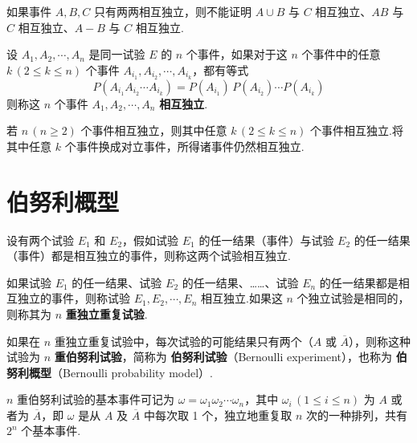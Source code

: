 \begin{note}
    \indent 如果事件 $A,B,C$ 只有两两相互独立，则不能证明 $A \cup B$ 与 $C$ 相互独立、$AB$ 与 $C$ 相互独立、$A-B$ 与 $C$ 相互独立.
\end{note}

\begin{definition}
    \indent 设 $A_1,A_2,\cdots,A_n$ 是同一试验 $E$ 的 $n$ 个事件，如果对于这 $n$ 个事件中的任意 $k\,(2\leqslant k\leqslant n)$ 个事件 $A_{i_1},A_{i_2},\cdots,A_{i_k}$，都有等式
    $$
    P(A_{i_1} A_{i_2} \cdots A_{i_k}) = P(A_{i_1}) \, P(A_{i_2}) \cdots P(A_{i_k})
    $$
    则称这 $n$ 个事件 $A_1,A_2,\cdots,A_n$ \textbf{相互独立}.
\end{definition}

\begin{conclusion}
    \indent 若 $n\, (n \geqslant 2)$ 个事件相互独立，则其中任意 $k\, (2 \leqslant k \leqslant n)$ 个事件相互独立.将其中任意 $k$ 个事件换成对立事件，所得诸事件仍然相互独立.
\end{conclusion}

\section{伯努利概型}

\begin{definition}
    \indent 设有两个试验 $E_1$ 和 $E_2$，假如试验 $E_1$ 的任一结果（事件）与试验 $E_2$ 的任一结果（事件）都是相互独立的事件，则称这两个试验相互独立.
\end{definition}

\begin{definition}
    \indent 如果试验 $E_1$ 的任一结果、试验 $E_2$ 的任一结果、……、试验 $E_n$ 的任一结果都是相互独立的事件，则称试验 $E_1, E_2, \cdots, E_n$ 相互独立.如果这 $n$ 个独立试验是相同的，则称其为 $n$ \textbf{重独立重复试验}.
\end{definition}

\begin{definition}
    \indent 如果在 $n$ 重独立重复试验中，每次试验的可能结果只有两个（$A$ 或 $\overline{A}$），则称这种试验为 $n$ \textbf{重伯努利试验}，简称为 \textbf{伯努利试验}（Bernoulli experiment），也称为 \textbf{伯努利概型}（Bernoulli probability model）.
\end{definition}

$n$ 重伯努利试验的基本事件可记为 $\omega=\omega_1 \omega_2 \cdots \omega_n$，其中 $\omega_i\,(1\leqslant i\leqslant n)$ 为 $A$ 或者为 $\overline{A}$，即 $\omega$ 是从 $A$ 及 $\overline{A}$ 中每次取 1 个，独立地重复取 $n$ 次的一种排列，共有 $2^n$ 个基本事件.

